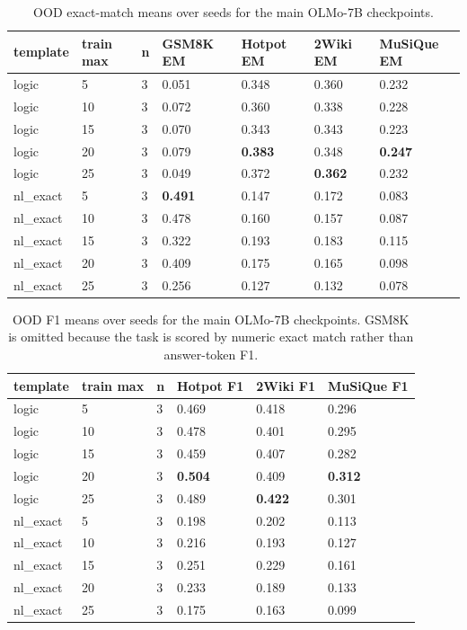 \documentclass[10pt]{article}
\begin{document}
\begin{table}[H]
\centering
\scriptsize
\begin{tabular}{lllllll}
\toprule
template & train max & n & GSM8K EM & Hotpot EM & 2Wiki EM & MuSiQue EM \\
\midrule
logic & 5 & 3 & 0.051 & 0.348 & 0.360 & 0.232 \\
logic & 10 & 3 & 0.072 & 0.360 & 0.338 & 0.228 \\
logic & 15 & 3 & 0.070 & 0.343 & 0.343 & 0.223 \\
logic & 20 & 3 & 0.079 & \textbf{0.383} & 0.348 & \textbf{0.247} \\
logic & 25 & 3 & 0.049 & 0.372 & \textbf{0.362} & 0.232 \\
nl\_exact & 5 & 3 & \textbf{0.491} & 0.147 & 0.172 & 0.083 \\
nl\_exact & 10 & 3 & 0.478 & 0.160 & 0.157 & 0.087 \\
nl\_exact & 15 & 3 & 0.322 & 0.193 & 0.183 & 0.115 \\
nl\_exact & 20 & 3 & 0.409 & 0.175 & 0.165 & 0.098 \\
nl\_exact & 25 & 3 & 0.256 & 0.127 & 0.132 & 0.078 \\
\bottomrule
\end{tabular}
\caption{OOD exact-match means over seeds for the main OLMo-7B checkpoints.}
\end{table}

\begin{table}[H]
\centering
\scriptsize
\begin{tabular}{llllll}
\toprule
template & train max & n & Hotpot F1 & 2Wiki F1 & MuSiQue F1 \\
\midrule
logic & 5 & 3 & 0.469 & 0.418 & 0.296 \\
logic & 10 & 3 & 0.478 & 0.401 & 0.295 \\
logic & 15 & 3 & 0.459 & 0.407 & 0.282 \\
logic & 20 & 3 & \textbf{0.504} & 0.409 & \textbf{0.312} \\
logic & 25 & 3 & 0.489 & \textbf{0.422} & 0.301 \\
nl\_exact & 5 & 3 & 0.198 & 0.202 & 0.113 \\
nl\_exact & 10 & 3 & 0.216 & 0.193 & 0.127 \\
nl\_exact & 15 & 3 & 0.251 & 0.229 & 0.161 \\
nl\_exact & 20 & 3 & 0.233 & 0.189 & 0.133 \\
nl\_exact & 25 & 3 & 0.175 & 0.163 & 0.099 \\
\bottomrule
\end{tabular}
\caption{OOD F1 means over seeds for the main OLMo-7B checkpoints. GSM8K is omitted because the task is scored by numeric exact match rather than answer-token F1.}
\end{table}
\end{document}
